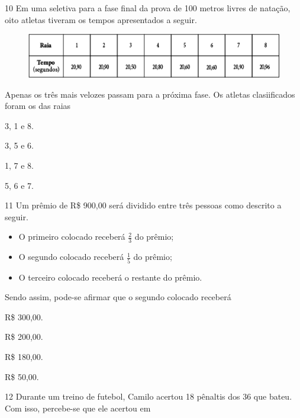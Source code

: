 \num{10} Em uma seletiva para a fase final da prova de 100 metros livres de
natação, oito atletas tiveram os tempos apresentados a seguir.

\begin{figure}[htpb!]
\centering
\includegraphics[width=\textwidth]{media/image86.png}
\end{figure}

Apenas os três mais velozes passam para a próxima fase. Os atletas clasiificados foram os das raias

\begin{multicols}{2}
\begin{escolha}
\item
  3, 1 e 8.
\item
  3, 5 e 6.
\item
  1, 7 e 8.
\item
  5, 6 e 7.
\end{escolha}
\end{multicols}


\num{11} Um prêmio de R\$ 900,00 será dividido entre três pessoas como descrito a seguir.

\begin{itemize}
\item
  O primeiro colocado receberá $\frac{2}{3}$ do prêmio;
\item
  O segundo colocado receberá $\frac{1}{5}$ do prêmio;
\item
  O terceiro colocado receberá o restante do prêmio.
\end{itemize}

Sendo assim, pode-se afirmar que o segundo colocado receberá

\begin{multicols}{2}
\begin{escolha}
\item
  R\$ 300,00.
\item
  R\$ 200,00.
\item
  R\$ 180,00.
\item
  R\$ 50,00.
\end{escolha}
\end{multicols}



\num{12} Durante um treino de futebol, Camilo acertou 18 pênaltis dos 36 que
bateu. Com isso, percebe-se que ele acertou em

